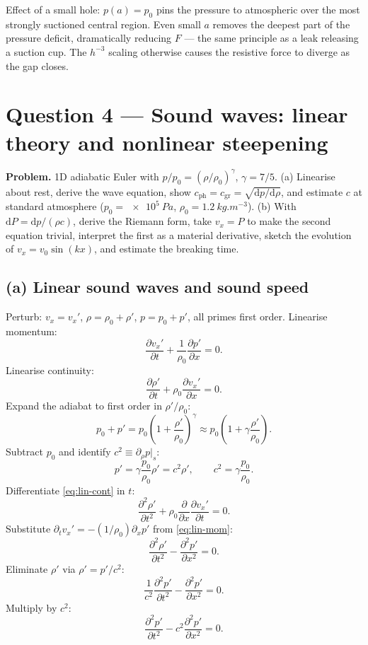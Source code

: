 \documentclass[11pt]{article}
\newcommand{\de}{\mathrm{d}}
\newcommand{\pd}[2]{\frac{\partial #1}{\partial #2}}
\newcommand{\pdd}[2]{\frac{\partial^{2} #1}{\partial #2^{2}}}
\begin{document}
Effect of a small hole: $p(a)=p_0$ pins the pressure to atmospheric over the most strongly suctioned central region. Even small $a$ removes the deepest part of the pressure deficit, dramatically reducing $F$ --- the same principle as a leak releasing a suction cup. The $h^{-3}$ scaling otherwise causes the resistive force to diverge as the gap closes.

\section*{Question 4 --- Sound waves: linear theory and nonlinear steepening}

\textbf{Problem.} 1D adiabatic Euler with $p/p_0=(\rho/\rho_0)^\gamma$, $\gamma=7/5$. (a) Linearise about rest, derive the wave equation, show $c_\text{ph}=c_\text{gr}=\sqrt{\de p/\de\rho}$, and estimate $c$ at standard atmosphere ($p_0=\SI{e5}{Pa}$, $\rho_0=\SI{1.2}{kg.m^{-3}}$). (b) With $\de P=\de p/(\rho c)$, derive the Riemann form, take $v_x=P$ to make the second equation trivial, interpret the first as a material derivative, sketch the evolution of $v_x=v_0\sin(kx)$, and estimate the breaking time.

\subsection*{(a) Linear sound waves and sound speed}

Perturb: $v_x=v_x'$, $\rho=\rho_0+\rho'$, $p=p_0+p'$, all primes first order. Linearise momentum:
\begin{equation}
\pd{v_x'}{t} + \frac{1}{\rho_0}\pd{p'}{x} = 0.
\label{eq:lin-mom}
\end{equation}
Linearise continuity:
\begin{equation}
\pd{\rho'}{t} + \rho_0\pd{v_x'}{x} = 0.
\label{eq:lin-cont}
\end{equation}
Expand the adiabat to first order in $\rho'/\rho_0$:
\[ p_0+p' = p_0\!\left(1+\frac{\rho'}{\rho_0}\right)^\gamma \approx p_0\!\left(1+\gamma\frac{\rho'}{\rho_0}\right). \]
Subtract $p_0$ and identify $c^2\equiv\partial_\rho p|_s$:
\[ p' = \gamma\frac{p_0}{\rho_0}\rho' = c^2\rho',\qquad c^2 = \gamma\frac{p_0}{\rho_0}. \]
Differentiate \eqref{eq:lin-cont} in $t$:
\[ \pdd{\rho'}{t} + \rho_0\pd{}{x}\!\pd{v_x'}{t} = 0. \]
Substitute $\partial_t v_x'=-(1/\rho_0)\partial_x p'$ from \eqref{eq:lin-mom}:
\[ \pdd{\rho'}{t} - \pdd{p'}{x} = 0. \]
Eliminate $\rho'$ via $\rho'=p'/c^2$:
\[ \frac{1}{c^2}\pdd{p'}{t} - \pdd{p'}{x} = 0. \]
Multiply by $c^2$:
\begin{equation}
\pdd{p'}{t} - c^2\pdd{p'}{x} = 0.
\label{eq:wave-eqn}
\end{equation}
\end{document}
